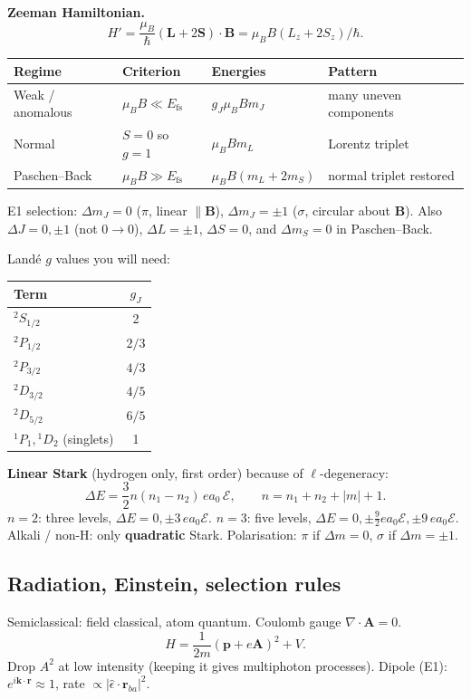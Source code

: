 \documentclass[11pt,a4paper]{article}
\begin{document}
\textbf{Zeeman Hamiltonian.}
\[
H'=\frac{\mu_B}{\hbar}(\mathbf{L}+2\mathbf{S})\cdot\mathbf{B}=\mu_B B(L_z+2S_z)/\hbar.
\]
\begin{center}
\small
\begin{tabular}{@{}llll@{}}
\toprule
Regime & Criterion & Energies & Pattern \\
\midrule
Weak / anomalous & \(\mu_B B\ll E_{\mathrm{fs}}\) & \(g_J\mu_B B m_J\) & many uneven components \\
Normal & \(S=0\) so \(g=1\) & \(\mu_B B m_L\) & Lorentz triplet \\
Paschen--Back & \(\mu_B B\gg E_{\mathrm{fs}}\) & \(\mu_B B(m_L+2m_S)\) & normal triplet restored \\
\bottomrule
\end{tabular}
\end{center}
E1 selection: \(\Delta m_J=0\) (\textbf{\(\pi\)}, linear \(\parallel\mathbf{B}\)),
\(\Delta m_J=\pm 1\) (\textbf{\(\sigma\)}, circular about \(\mathbf{B}\)).
Also \(\Delta J=0,\pm 1\) (not \(0\to 0\)), \(\Delta L=\pm 1\), \(\Delta S=0\), and \(\Delta m_S=0\) in Paschen--Back.

Land\'e \(g\) values you will need:
\begin{center}
\begin{tabular}{@{}lc@{}}
\toprule
Term & \(g_J\) \\
\midrule
\({}^2S_{1/2}\) & 2 \\
\({}^2P_{1/2}\) & \(2/3\) \\
\({}^2P_{3/2}\) & \(4/3\) \\
\({}^2D_{3/2}\) & \(4/5\) \\
\({}^2D_{5/2}\) & \(6/5\) \\
\({}^1P_1,{}^1D_2\) (singlets) & 1 \\
\bottomrule
\end{tabular}
\end{center}

\textbf{Linear Stark} (hydrogen only, first order) because of \(\ell\)-degeneracy:
\[
\Delta E=\frac32 n(n_1-n_2)\,e a_0\,\mathcal{E},\qquad n=n_1+n_2+|m|+1.
\]
\(n=2\): three levels, \(\Delta E=0,\pm 3\,e a_0\mathcal{E}\).
\(n=3\): five levels, \(\Delta E=0,\pm\tfrac92 e a_0\mathcal{E},\pm 9\,e a_0\mathcal{E}\).
Alkali / non-H: only \textbf{quadratic} Stark.
Polarisation: \(\pi\) if \(\Delta m=0\), \(\sigma\) if \(\Delta m=\pm 1\).

\subsection{Radiation, Einstein, selection rules}
Semiclassical: field classical, atom quantum. Coulomb gauge \(\nabla\cdot\mathbf{A}=0\).
\[
H=\frac1{2m}(\mathbf{p}+e\mathbf{A})^2+V.
\]
Drop \(A^2\) at low intensity (keeping it gives multiphoton processes).
Dipole (E1): \(e^{i\mathbf{k}\cdot\mathbf{r}}\approx 1\), rate \(\propto|\hat{\epsilon}\cdot\mathbf{r}_{ba}|^2\).
\end{document}
